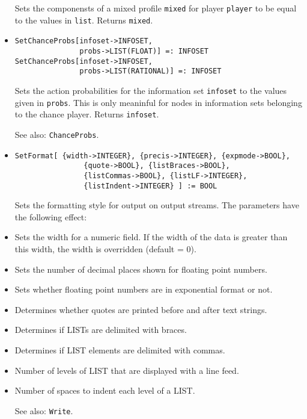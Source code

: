 \begin{itemize}
\bd
Sets the componensts of a mixed profile \verb+mixed+ for player
\verb+player+ to be equal to the values in \verb+list+.
Returns \verb+mixed+. 
\ed

\item
\protect \large \begin{verbatim} 
SetChanceProbs[infoset->INFOSET, 
               probs->LIST(FLOAT)] =: INFOSET
SetChanceProbs[infoset->INFOSET, 
               probs->LIST(RATIONAL)] =: INFOSET
\end{verbatim}\normalsize

\bd
Sets the action probabilities for the information set
\verb+infoset+ to the values given in \verb+probs+.  This is only
meaninful for nodes in information sets belonging to the chance
player.  Returns \verb+infoset+. 
\item
[See also:] {\tt ChanceProbs}.
\ed


\item
\protect \large \begin{verbatim}
SetFormat[ {width->INTEGER}, {precis->INTEGER}, {expmode->BOOL},
                {quote->BOOL}, {listBraces->BOOL},
                {listCommas->BOOL}, {listLF->INTEGER},
                {listIndent->INTEGER} ] := BOOL
\end{verbatim}\normalsize

\bd Sets the formatting style for output on output streams.  The
parameters have the following effect:
\bd
\item[\verb+width+] Sets the width for a numeric field. If the width
of the data is greater than this width, the width is overridden (default = 0).
\item[\verb+precis+] Sets the number of decimal places shown for floating
point numbers.
\item[\verb+expmode+] Sets whether floating point numbers are in
exponential format or not.
\item[\verb+quote+] Determines whether quotes are printed before and
after text strings.
\item[\verb+listBraces+] Determines if LISTs are delimited with
braces.
\item[\verb+listCommas+] Determines if LIST elements are delimited
with commas.
\item[\verb+listLF+] Number of levels of LIST that are displayed with
a line feed.  
\item[\verb+listIndent+] Number of spaces to indent each level of a
LIST. 
\ed

\item
[See also:] {\tt Write}.
\ed


\end{itemize}
